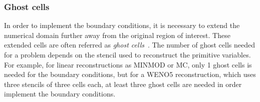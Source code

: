 \subsubsection{Ghost cells}
\label{subsubsec:ghost}

In order to implement the boundary conditions, it is necessary to extend the numerical domain further away from the original region of interest. These extended cells are often referred as \textit{ghost cells}~\citep[see for example][]{leveque2002,hindenlang2019}. The number of ghost cells needed for a problem depends on the stencil used to reconstruct the primitive variables. For example, for linear reconstructions as MINMOD or MC, only 1 ghost cells is needed for the boundary conditions, but for a WENO5 reconstruction, which uses three stencils of three cells each, at least three ghost cells are needed in order implement the boundary conditions.